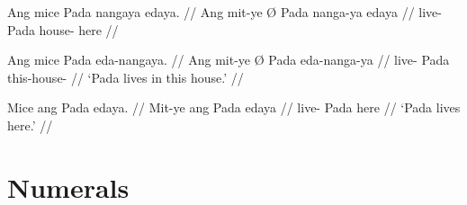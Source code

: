 \pex
\a\ljudge*\label{ex:edayamod}\begingl
	\gla Ang mice {} Pada nangaya edaya. //
	\glb Ang mit-ye Ø Pada nanga-ya edaya //
	\glc \AgtT{} live-\TsgF{} \Top{} Pada house-\Loc{} here //
\endgl

\a\label{ex:edanp}\begingl
	\gla Ang mice {} Pada eda-nangaya. //
	\glb Ang mit-ye Ø Pada eda-nanga-ya //
	\glc \AgtT{} live-\TsgF{} \Top{} Pada this-house-\Loc{} //
	\glft `Pada lives in this house.' //
\endgl

\a\label{ex:edanyapro}\begingl
	\gla Mice ang Pada edaya. //
	\glb Mit-ye ang Pada edaya //
	\glc live-\TsgF{} \Aarg{} Pada here //
	\glft `Pada lives here.' //
\endgl

\xe



\section{Numerals}

